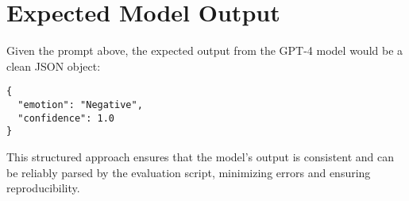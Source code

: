 \section{Expected Model Output}

Given the prompt above, the expected output from the GPT-4 model would be a clean JSON object:
\begin{verbatim}
{
  "emotion": "Negative",
  "confidence": 1.0
}
\end{verbatim}

This structured approach ensures that the model's output is consistent and can be reliably parsed by the evaluation script, minimizing errors and ensuring reproducibility.